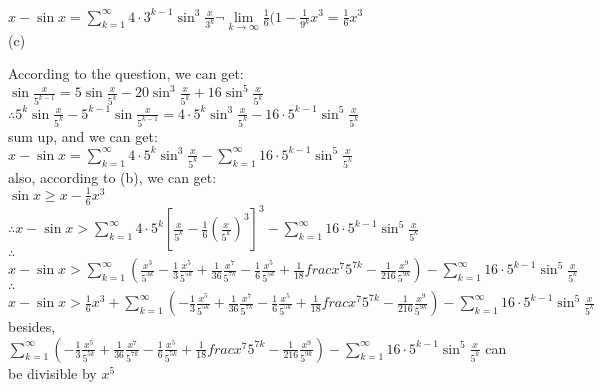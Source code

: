 \documentclass{article}
\begin{document}
$\displaystyle x-\sin x=\sum \limits_{k=1}^{\infty}4\cdot3^{k-1}\sin^3\frac{x}{3^k}\neg\lim \limits_{k \to \infty}\frac{1}{6}(1-\frac{1}{9^k}x^3=\frac{1}{6}x^3$\\

(c)

According to the question, we can get:\\

$\displaystyle\sin\frac{x}{5^{k-1}}=5\sin\frac{x}{5^k}-20\sin^3\frac{x}{5^k}+16\sin^5\frac{x}{5^k}$\\

$\therefore$\qquad$\displaystyle5^k\sin\frac{x}{5^k}-5^{k-1}\sin\frac{x}{5^{k-1}}=4\cdot5^k\sin^3\frac{x}{5^k}-16\cdot5^{k-1}\sin^5\frac{x}{5^k}$\\

sum up, and we can get:\\

$x-\sin x=\sum \limits_{k=1}^{\infty}4\cdot5^k\sin^3\frac{x}{5^k}-\sum \limits_{k=1}^{\infty}16\cdot5^{k-1}\sin^5\frac{x}{5^k}$\\

also, according to (b), we can get:\\

$\sin x\geq x-\frac{1}{6}x^3$\\

$\therefore$\qquad$\displaystyle x-\sin x>\sum \limits_{k=1}^{\infty}4\cdot5^k\left[\frac{x}{5^k}-\frac{1}{6}\left(\frac{x}{5^k}\right)^3\right]^3-\sum \limits_{k=1}^{\infty}16\cdot5^{k-1}\sin^5\frac{x}{5^k}$\\

$\therefore$\qquad$\displaystyle x-\sin x>\sum \limits_{k=1}^{\infty}\left(\frac{x^3}{5^{3k}}-\frac{1}{3}\frac{x^5}{5^{5k}}+\frac{1}{36}\frac{x^7}{5^{7k}}-\frac{1}{6}\frac{x^5}{5^{5k}}+\frac{1}{18}frac{x^7}{5^{7k}}-\frac{1}{216}\frac{x^9}{5^{9k}}\right)-\sum \limits_{k=1}^{\infty}16\cdot5^{k-1}\sin^5\frac{x}{5^k}$\\

$\therefore$\qquad$\displaystyle x-\sin x>\frac{1}{6}x^3+\sum \limits_{k=1}^{\infty}\left(-\frac{1}{3}\frac{x^5}{5^{5k}}+\frac{1}{36}\frac{x^7}{5^{7k}}-\frac{1}{6}\frac{x^5}{5^{5k}}+\frac{1}{18}frac{x^7}{5^{7k}}-\frac{1}{216}\frac{x^9}{5^{9k}}\right)-\sum \limits_{k=1}^{\infty}16\cdot5^{k-1}\sin^5\frac{x}{5^k}$\\

besides, $\sum \limits_{k=1}^{\infty}\left(-\frac{1}{3}\frac{x^5}{5^{5k}}+\frac{1}{36}\frac{x^7}{5^{7k}}-\frac{1}{6}\frac{x^5}{5^{5k}}+\frac{1}{18}frac{x^7}{5^{7k}}-\frac{1}{216}\frac{x^9}{5^{9k}}\right)-\sum \limits_{k=1}^{\infty}16\cdot5^{k-1}\sin^5\frac{x}{5^k}$ can be divisible by $x^5$\\
\end{document}
